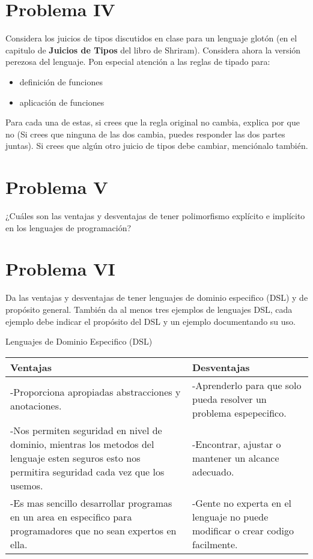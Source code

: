 \documentclass{article}
\begin{document}
\section*{Problema IV}
Considera los juicios de tipos discutidos en clase para un lenguaje glotón
(en el capitulo de \textbf{Juicios de Tipos} del libro de Shriram).
Considera ahora la versión perezosa del lenguaje. Pon especial atención a
las reglas de tipado para:

\begin{itemize}
\item definición de funciones
\item aplicación de funciones
\end{itemize}

Para cada una de estas, si crees que la regla original no cambia, explica por que no
(Si crees que ninguna de las dos cambia, puedes responder las dos partes juntas).
Si crees que algún otro juicio de tipos debe cambiar, menciónalo también.

\section*{Problema V}
¿Cuáles son las ventajas y desventajas de tener polimorfismo explícito e implícito
en los lenguajes de programación?

\section*{Problema VI}
Da las ventajas y desventajas de tener lenguajes de dominio especifico (DSL)
y de propósito general. También da al menos tres ejemplos de lenguajes DSL,
cada ejemplo debe indicar el propósito del DSL y un ejemplo documentando su uso.
\\
\begin{center}
Lenguajes de Dominio Especifico (DSL)
\end{center}
\begin{tabularx}{\textwidth}{X|X}
	  \textbf{Ventajas} & \textbf{Desventajas} \\
	\hline
	-Proporciona apropiadas abstracciones y anotaciones. & -Aprenderlo para que solo pueda resolver un problema espepecifico.\\
	-Nos permiten seguridad en nivel de dominio, mientras los metodos del lenguaje esten seguros esto nos permitira seguridad cada vez que los usemos. & -Encontrar, ajustar o mantener un alcance adecuado.\\
	-Es mas sencillo desarrollar programas en un area en especifico para programadores que no sean expertos en ella. & -Gente no experta en el lenguaje no puede modificar o crear codigo facilmente.\\
\end{tabularx}
\end{document}
